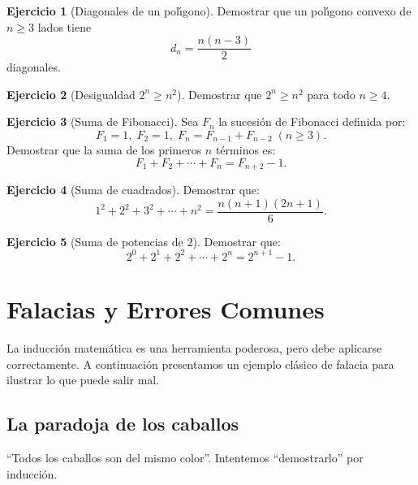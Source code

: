 \documentclass[11pt,a4paper]{article}
\theoremstyle{definition}
\theoremstyle{plain}
\theoremstyle{definition}
\theoremstyle{definition}
\newtheorem{ejercicio}{Ejercicio}[section]
\theoremstyle{remark}
\begin{document}
\begin{ejercicio}[Diagonales de un pol\'{\i}gono]
\label{ej:diagonales}
Demostrar que un pol\'{\i}gono convexo de $n \geq 3$ lados tiene
\[
d_n = \frac{n(n-3)}{2}
\]
diagonales.
\end{ejercicio}

\begin{ejercicio}[Desigualdad $2^{n} \geq n^{2}$]
\label{ej:desigualdad2n}
Demostrar que $2^{n} \geq n^{2}$ para todo $n \geq 4$.
\end{ejercicio}

\begin{ejercicio}[Suma de Fibonacci]
\label{ej:fibonacci}
Sea $F_n$ la sucesi\'on de Fibonacci definida por:
\[
F_1 = 1,\; F_2 = 1,\; F_n = F_{n-1} + F_{n-2}\;(n\geq 3).
\]
Demostrar que la suma de los primeros $n$ t\'erminos es:
\[
F_1 + F_2 + \cdots + F_n = F_{n+2} - 1.
\]
\end{ejercicio}

\begin{ejercicio}[Suma de cuadrados]
\label{ej:cuadrados}
Demostrar que:
\[
1^{2} + 2^{2} + 3^{2} + \cdots + n^{2} = \frac{n(n+1)(2n+1)}{6}.
\]
\end{ejercicio}

\begin{ejercicio}[Suma de potencias de $2$]
\label{ej:potencias2}
Demostrar que:
\[
2^{0} + 2^{1} + 2^{2} + \cdots + 2^{n} = 2^{n+1} - 1.
\]
\end{ejercicio}

\section{Falacias y Errores Comunes}

La inducci\'on matem\'atica es una herramienta poderosa, pero debe aplicarse
correctamente. A continuaci\'on presentamos un ejemplo cl\'asico de falacia
para ilustrar lo que puede salir mal.

\subsection*{La paradoja de los caballos}

\enquote{Todos los caballos son del mismo color}. Intentemos \enquote{demostrarlo}
por inducci\'on.
\end{document}
